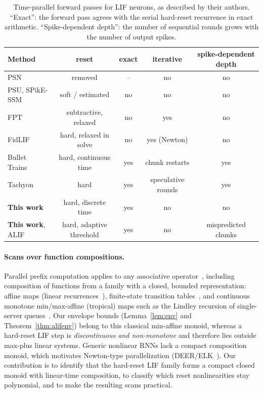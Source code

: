 \documentclass[10pt]{article}
\theoremstyle{remark}
\begin{document}
\begin{table}[t]
\centering\footnotesize
\setlength{\tabcolsep}{4pt}
\begin{tabular}{lcccc}
\toprule
Method & reset & exact & iterative & spike-dependent depth\\
\midrule
PSN~\citep{fang2023psn} & removed & -- & no & no\\
PSU, SPikE-SSM~\citep{li2024psu,zhong2024spikessm} & soft / estimated & no & no & no\\
FPT~\citep{feng2025fpt} & subtractive, relaxed & no & yes & no\\
FidLIF~\citep{he2026fidlif} & hard, relaxed in solve & no & yes (Newton) & no\\
Bullet Trains~\citep{morrill2026bullet} & hard, continuous time & yes & chunk restarts & yes\\
Tachyon~\citep{tachyon2026} & hard & yes & speculative rounds & yes\\
\textbf{This work} & hard, discrete time & yes & no & no\\
\textbf{This work}, ALIF & hard, adaptive threshold & yes & no & mispredicted chunks\\
\bottomrule
\end{tabular}
\caption{Time-parallel forward passes for LIF neurons, as described by their authors. ``Exact'': the forward pass agrees with the serial hard-reset recurrence in exact arithmetic. ``Spike-dependent depth'': the number of sequential rounds grows with the number of output spikes.}
\label{tab:methods}
\end{table}

\paragraph{Scans over function compositions.}
Parallel prefix computation applies to any associative operator~\citep{ladner1980,blelloch1990prefix}, including composition of functions from a family with a closed, bounded representation: affine maps (linear recurrences~\citep{kogge1973parallel,martin2018parallelizing}), finite-state transition tables~\citep{ladner1980}, and continuous monotone min/max-affine (tropical) maps such as the Lindley recursion of single-server queues~\citep{lindley1952,greenberg1991,baccelli1992}. Our envelope bounds (Lemma~\ref{lem:env} and Theorem~\ref{thm:alifenv}) belong to this classical min-affine monoid, whereas a hard-reset LIF step is \emph{discontinuous and non-monotone} and therefore lies outside max-plus linear systems. Generic nonlinear RNNs lack a compact composition monoid, which motivates Newton-type parallelization (DEER/ELK~\citep{lim2024deer,gonzalez2024elk}). Our contribution is to identify that the hard-reset LIF family forms a compact closed monoid with linear-time composition, to classify which reset nonlinearities stay polynomial, and to make the resulting scans practical.
\end{document}
